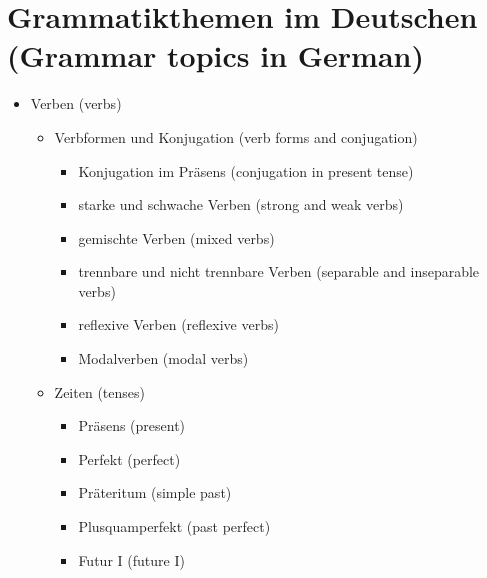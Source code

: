 \documentclass[a4paper]{article}
\title{}
\date{}
\begin{document}
    \maketitle
    
    
    \section{Grammatikthemen im Deutschen {\small (Grammar topics in German)}}
        
        \begin{itemize}
            \item Verben {\small (verbs)}
            \begin{itemize}
                \item Verbformen und Konjugation {\small (verb forms and conjugation)}
                \begin{itemize}
                    \item Konjugation im Präsens {\small (conjugation in present tense)}
                    \item starke und schwache Verben {\small (strong and weak verbs)}
                    \item gemischte Verben {\small (mixed verbs)}
                    \item trennbare und nicht trennbare Verben {\small (separable and inseparable verbs)}
                    \item reflexive Verben {\small (reflexive verbs)}
                    \item Modalverben {\small (modal verbs)}
                \end{itemize}
                
                \item Zeiten {\small (tenses)}
                \begin{itemize}
                    \item Präsens {\small (present)}
                    \item Perfekt {\small (perfect)}
                    \item Präteritum {\small (simple past)}
                    \item Plusquamperfekt {\small (past perfect)}
                    \item Futur I {\small (future I)}
                \end{itemize}
                

\end{itemize}
\end{itemize}
\end{document}
